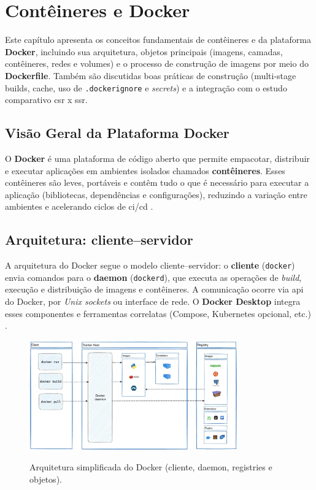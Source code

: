 \section{Contêineres e Docker}
\label{cap:docker}

Este capítulo apresenta os conceitos fundamentais de contêineres e da plataforma \textbf{Docker}, incluindo sua arquitetura, objetos principais (imagens, camadas, contêineres, redes e volumes) e o processo de construção de imagens por meio do \textbf{Dockerfile}. Também são discutidas boas práticas de construção (multi-stage builds, cache, uso de \texttt{.dockerignore} e \textit{secrets}) e a integração com o estudo comparativo \acrshort{csr} x \acrshort{ssr}. \cite{docker_overview,dockerfile_ref} 

\subsection{Visão Geral da Plataforma Docker}
\label{sec:docker-overview}

O \textbf{Docker} é uma plataforma de código aberto que permite empacotar, distribuir e executar aplicações em ambientes isolados chamados \textbf{contêineres}. Esses contêineres são leves, portáveis e contêm tudo o que é necessário para executar a aplicação (bibliotecas, dependências e configurações), reduzindo a variação entre ambientes e acelerando ciclos de \acrshort{ci}/\acrshort{cd} \cite{docker_overview}. 

\subsection{Arquitetura: cliente–servidor}
\label{subsec:docker-arquitetura}

A arquitetura do Docker segue o modelo cliente–servidor: o \textbf{cliente} (\texttt{docker}) envia comandos para o \textbf{daemon} (\texttt{dockerd}), que executa as operações de \textit{build}, execução e distribuição de imagens e contêineres. A comunicação ocorre via \acrshort{api} do Docker, por \textit{Unix sockets} ou interface de rede. O \textbf{Docker Desktop} integra esses componentes e ferramentas correlatas (Compose, Kubernetes opcional, etc.) \cite{docker_overview}. 

\begin{figure}[H]
  \centering
  \caption{Arquitetura simplificada do Docker (cliente, daemon, registries e objetos).}
  \includegraphics[width=0.8\textwidth]{media/docker_architecture.png}
  \label{fig:docker-arquitetura}
\end{figure}

